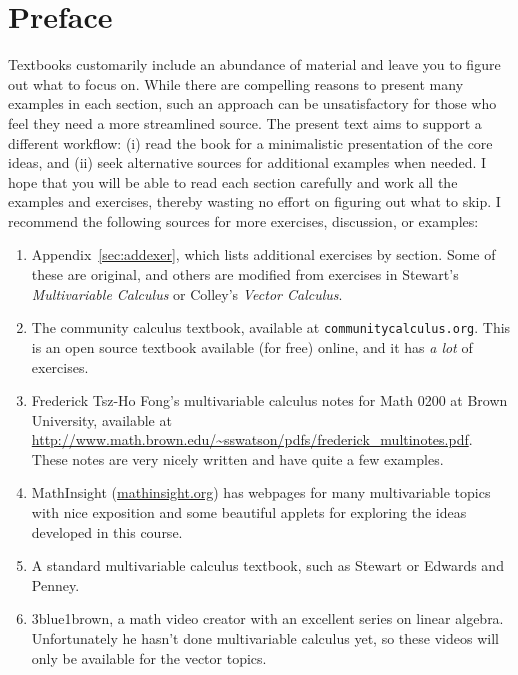 \documentclass{watsonbook}
\begin{document}

\newpage 
\pagecolor{white} 
\hphantom{a} \thispagestyle{empty} 
\newpage

\chapter*{Preface} \thispagestyle{empty} 


Textbooks customarily include an abundance of material and leave you
to figure out what to focus on. While there are compelling reasons to
present many examples in each section, such an approach can be
unsatisfactory for those who feel they need a more streamlined
source. The present text aims to support a different workflow: (i)
read the book for a minimalistic presentation of the core ideas, and
(ii) seek alternative sources for additional examples when needed. I
hope that you will be able to read each section carefully and work all
the examples and exercises, thereby wasting no effort on figuring out
what to skip. I recommend the following sources for more exercises,
discussion, or examples:
\begin{enumerate}[itemsep = 3pt]
\item Appendix~\ref{sec:addexer}, which lists additional exercises by
  section. Some of these are original, and others are
  modified from exercises in 
  Stewart's \textit{Multivariable Calculus} or Colley's \textit{Vector
    Calculus}. 
\item The community calculus textbook, available at
  \texttt{communitycalculus.org}. This is an open source textbook available (for
  free) online, and it has \textit{a lot} of exercises. 
\item Frederick Tsz-Ho Fong's multivariable calculus notes for Math 0200 at
  Brown University, available at
  \href{http://www.math.brown.edu/~sswatson/pdfs/frederick_multinotes.pdf}{\url{http://www.math.brown.edu/~sswatson/pdfs/frederick\_multinotes.pdf}}. These
  notes are very nicely written and have quite a few examples. 
\item MathInsight (\url{mathinsight.org}) has webpages for many
  multivariable topics with nice exposition and some beautiful applets for exploring the
  ideas developed in this course. 
\item A standard multivariable calculus textbook, such as Stewart
  or Edwards and Penney. 
\item 3blue1brown, a math video creator with an excellent series on
  linear algebra. Unfortunately he hasn't done multivariable calculus
  yet, so these videos will only be available for the vector topics. 
\end{enumerate}
\end{document}
